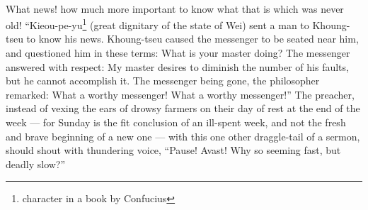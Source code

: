 \documentclass[letterpaper,12pt]{article}
\begin{document}
\paragraph{} What news! how much more important to know what that is which was
never old!  \enquote{Kieou-pe-yu\footnote{character in a book by Confucius}
    (great dignitary of the state of Wei) sent a man to Khoung-tseu to know his
    news. Khoung-tseu caused the messenger to be seated near him, and questioned
    him in these terms: What is your master doing? The messenger answered with
    respect: My master desires to diminish the number of his faults, but he
    cannot accomplish it. The messenger being gone, the philosopher remarked:
    What a worthy messenger! What a worthy messenger!} The preacher, instead of
vexing the ears of drowsy farmers on their day of rest at the end of the week
--- for Sunday is the fit conclusion of an ill-spent week, and not the fresh and
brave beginning of a new one --- with this one other draggle-tail of a sermon,
should shout with thundering voice, \enquote{Pause! Avast! Why so seeming fast,
    but deadly slow?}
\end{document}
